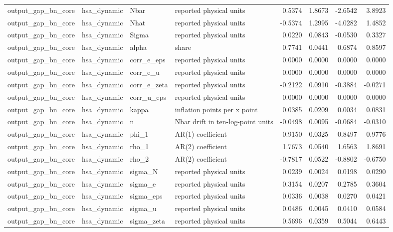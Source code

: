 \begin{tabular}{llllrrrr}
output\_gap\_bn\_core & hsa\_dynamic & Nbar & reported physical units & 0.5374 & 1.8673 & -2.6542 & 3.8923 \\
output\_gap\_bn\_core & hsa\_dynamic & Nhat & reported physical units & -0.5374 & 1.2995 & -4.0282 & 1.4852 \\
output\_gap\_bn\_core & hsa\_dynamic & Sigma & reported physical units & 0.0220 & 0.0843 & -0.0530 & 0.3327 \\
output\_gap\_bn\_core & hsa\_dynamic & alpha & share & 0.7741 & 0.0441 & 0.6874 & 0.8597 \\
output\_gap\_bn\_core & hsa\_dynamic & corr\_e\_eps & reported physical units & 0.0000 & 0.0000 & 0.0000 & 0.0000 \\
output\_gap\_bn\_core & hsa\_dynamic & corr\_e\_u & reported physical units & 0.0000 & 0.0000 & 0.0000 & 0.0000 \\
output\_gap\_bn\_core & hsa\_dynamic & corr\_e\_zeta & reported physical units & -0.2122 & 0.0910 & -0.3884 & -0.0271 \\
output\_gap\_bn\_core & hsa\_dynamic & corr\_u\_eps & reported physical units & 0.0000 & 0.0000 & 0.0000 & 0.0000 \\
output\_gap\_bn\_core & hsa\_dynamic & kappa & inflation points per x point & 0.0385 & 0.0209 & 0.0034 & 0.0831 \\
output\_gap\_bn\_core & hsa\_dynamic & n & Nbar drift in ten-log-point units & -0.0498 & 0.0095 & -0.0684 & -0.0310 \\
output\_gap\_bn\_core & hsa\_dynamic & phi\_1 & AR(1) coefficient & 0.9150 & 0.0325 & 0.8497 & 0.9776 \\
output\_gap\_bn\_core & hsa\_dynamic & rho\_1 & AR(2) coefficient & 1.7673 & 0.0540 & 1.6563 & 1.8691 \\
output\_gap\_bn\_core & hsa\_dynamic & rho\_2 & AR(2) coefficient & -0.7817 & 0.0522 & -0.8802 & -0.6750 \\
output\_gap\_bn\_core & hsa\_dynamic & sigma\_N & reported physical units & 0.0239 & 0.0024 & 0.0198 & 0.0290 \\
output\_gap\_bn\_core & hsa\_dynamic & sigma\_e & reported physical units & 0.3154 & 0.0207 & 0.2785 & 0.3604 \\
output\_gap\_bn\_core & hsa\_dynamic & sigma\_eps & reported physical units & 0.0336 & 0.0038 & 0.0270 & 0.0421 \\
output\_gap\_bn\_core & hsa\_dynamic & sigma\_u & reported physical units & 0.0486 & 0.0045 & 0.0410 & 0.0584 \\
output\_gap\_bn\_core & hsa\_dynamic & sigma\_zeta & reported physical units & 0.5696 & 0.0359 & 0.5044 & 0.6443 \\

\end{tabular}
